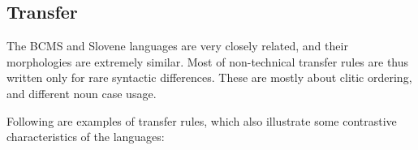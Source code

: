 \newcommand{\sentenceexample}[1]{{\small\enumsentence{#1}}}

\subsection{Transfer}

The BCMS and Slovene languages are very closely related, and their
morphologies are extremely similar. Most of non-technical transfer
rules are thus written only for rare syntactic differences. These are
mostly about clitic ordering, and different noun case usage.

Following are examples of transfer rules, which also illustrate some
contrastive characteristics of the languages:


